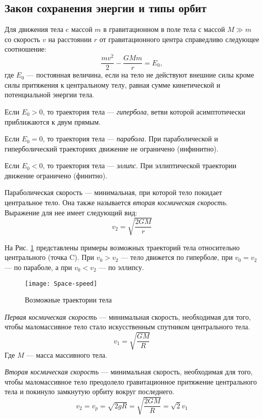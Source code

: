 \subsection{Закон сохранения энергии и типы орбит}
Для движения тела c массой $m$ в гравитационном  в поле тела 
с массой \linebreak $M\gg m$ со скорость $v$ на расстоянии $r$ от 
гравитационного центра справедливо следующее соотношение: 
\begin{equation}
\frac{m v^2}{2}-\frac{GM m }{r}=E_0,
\end{equation}
где $E_0$ --- постоянная величина, если на тело не действуют
внешние силы кроме силы притяжения к центральному телу, 
равная сумме кинетической и потенциальной энергии тела.

Если $E_0>0$, то траектория тела --- {\itshape гипербола}, 
ветви которой асимптотически приближаются к двум прямым.

Если $E_0=0$, то траектория тела --- {\itshape парабола}. При 
параболической и гиперболический траекториях движение не 
ограничено (инфинитно).

Если $E_0<0$, то траектория тела --- {\itshape эллипс}. При 
эллиптической траектории движение ограничено (финитно).

Параболическая скорость --- минимальная, при которой 
тело покидает центральное тело. Она также называется
{\itshape вторая космическая скорость}. Выражение для нее 
имеет следующий вид:\begin{equation}
v_{2}=\sqrt{\frac{2GM}{r}}
\end{equation}

На Рис. \ref{pic:orbits} представлены примеры возможных траекторий тела 
относительно центрального (точка C). При $v_0 > v_{2}$ --- тело движется 
по гиперболе, при $v_0 = v_{2}$ --- по параболе, 
а при $v_0 < v_{2}$ --- по эллипсу.
\begin{figure}[h!]
\centering
\texttt{[image: Space-speed]}
\caption{Возможные траектории тела \label{pic:orbits}}
\end{figure}

\textit{Первая космическая скорость} --- минимальная скорость, необходимая для того, чтобы маломассивное тело стало искусственным спутником центрального тела.
\begin{equation}v_1=\sqrt{\frac{GM}{R}}
\end{equation}
Где $M$ --- масса массивного тела.

\textit{Вторая космическая скорость} --- минимальная скорость, необходимая для того, чтобы маломассивное тело преодолело гравитационное притяжение центрального тела и покинуло замкнутую орбиту вокруг последнего. 
\begin{equation}v_2=v_p=\sqrt{2gR}=\sqrt{\frac{2GM}{R}}=\sqrt{2}v_1
\end{equation}

